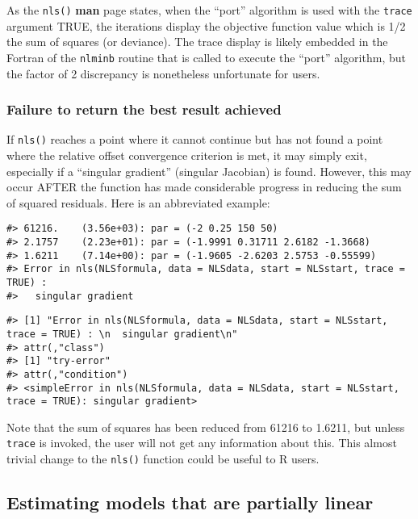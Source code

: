 As the \texttt{nls()} \textbf{man} page states, when the ``port'' algorithm is used with the
\texttt{trace} argument TRUE, the iterations display the objective function value which
is 1/2 the sum of squares (or deviance). The trace display is likely
embedded in the Fortran of the \texttt{nlminb} routine that is called to execute
the ``port'' algorithm, but the factor of 2 discrepancy is nonetheless
unfortunate for users.

\hypertarget{failure-to-return-the-best-result-achieved}{%
\subsubsection{Failure to return the best result achieved}\label{failure-to-return-the-best-result-achieved}}

If \texttt{nls()} reaches a point where it cannot continue but has not found a point
where the relative offset convergence criterion is met, it may simply exit,
especially if a ``singular gradient'' (singular Jacobian) is found. However,
this may occur AFTER the function has made considerable progress in reducing
the sum of squared residuals.
Here is an abbreviated example:

\begin{verbatim}
#> 61216.    (3.56e+03): par = (-2 0.25 150 50)
#> 2.1757    (2.23e+01): par = (-1.9991 0.31711 2.6182 -1.3668)
#> 1.6211    (7.14e+00): par = (-1.9605 -2.6203 2.5753 -0.55599)
#> Error in nls(NLSformula, data = NLSdata, start = NLSstart, trace = TRUE) : 
#>   singular gradient
\end{verbatim}

\begin{verbatim}
#> [1] "Error in nls(NLSformula, data = NLSdata, start = NLSstart, trace = TRUE) : \n  singular gradient\n"
#> attr(,"class")
#> [1] "try-error"
#> attr(,"condition")
#> <simpleError in nls(NLSformula, data = NLSdata, start = NLSstart, trace = TRUE): singular gradient>
\end{verbatim}

Note that the sum of squares has been reduced from 61216 to 1.6211, but
unless \texttt{trace} is invoked, the user will not get any information about this.
This almost trivial change to the \texttt{nls()} function could be
useful to R users.

\hypertarget{estimating-models-that-are-partially-linear}{%
\subsection{Estimating models that are partially linear}\label{estimating-models-that-are-partially-linear}}

